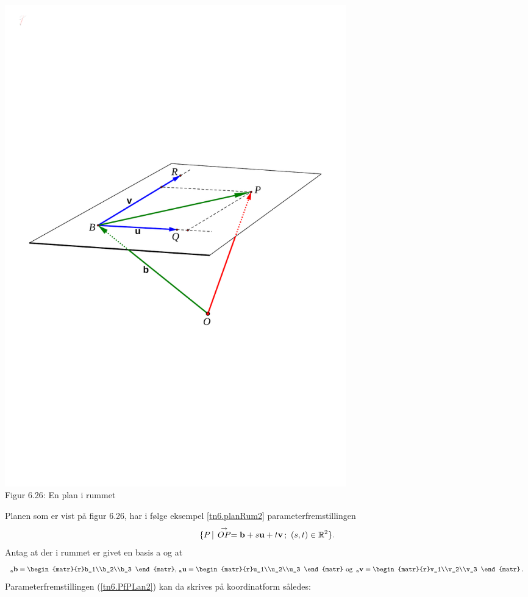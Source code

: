 \begin{example}
\begin{center}
		\includegraphics[trim=1.5cm 9.5cm 1.5cm
 9.5cm,width=0.65\textwidth,clip]{geometer/vektor15.pdf}	
   \\Figur 6.26: En plan i rummet	
\end{center}
Planen som er vist på figur 6.26, har i følge eksempel \ref{tn6.planRum2} parameterfremstillingen
\begin{equation}\label{tn6.PfPLan2}
\{P\,|\, \stackrel{\rightarrow}{OP}=\mathbf{b}+s\mathbf u+t\mathbf v\,;\,\,(s,t)\in \mathbb R^2\}.
\end{equation}
Antag at der i rummet er givet en basis a og at
$$
{_\mathrm{a}\mathbf{b}}=\begin{matr}{r}b_1\\b_2\\b_3 \end{matr},\,
{_\mathrm{a}\mathbf{u}}=\begin{matr}{r}u_1\\u_2\\u_3 \end{matr}\,\,\mathrm{og}\,\,\,
{_\mathrm{a}\mathbf{v}}=\begin{matr}{r}v_1\\v_2\\v_3 \end{matr}\,.
$$
Parameterfremstillingen (\ref{tn6.PfPLan2}) kan da skrives på koordinatform således:

\end{example}

